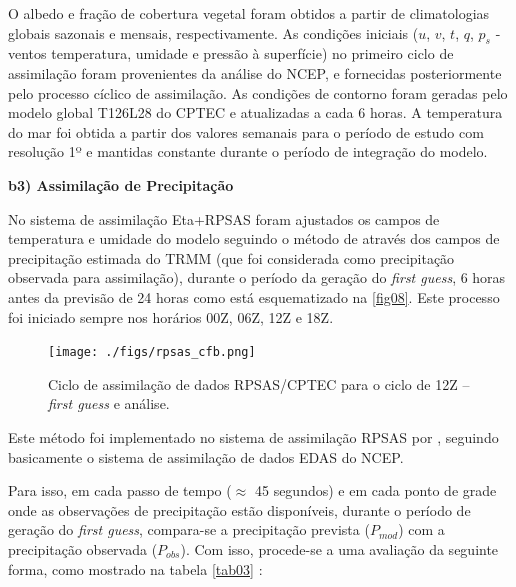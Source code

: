 O albedo e fração de cobertura vegetal foram obtidos a partir de climatologias globais sazonais e mensais, respectivamente. As condições iniciais ($u$, $v$, $t$, $q$, $p_{s}$ - ventos temperatura, umidade e pressão à superfície) no primeiro ciclo de assimilação foram provenientes da análise do NCEP, e fornecidas posteriormente pelo processo cíclico de assimilação.  As condições de contorno foram geradas pelo modelo global T126L28 do CPTEC e atualizadas a cada 6 horas. A temperatura do mar foi obtida a partir dos valores semanais para o período de estudo com resolução 1º e mantidas constante durante o período de integração do modelo.

\textbf{b3) Assimilação de Precipitação}

No sistema de assimilação Eta+RPSAS foram ajustados os campos de temperatura e umidade do modelo seguindo o método de  através dos campos de precipitação estimada do TRMM (que foi considerada como precipitação observada para assimilação), durante o período da geração do \textit{first guess}, 6 horas antes da previsão de 24 horas como está esquematizado na \autoref{fig08}. Este processo foi iniciado sempre nos horários 00Z, 06Z, 12Z e 18Z.

\begin{figure}
\centering
\texttt{[image: ./figs/rpsas\_cfb.png]}
\caption{Ciclo de assimilação de dados RPSAS/CPTEC para o ciclo de 12Z – \textit{first guess} e análise.}
\label{fig08}
\end{figure}

Este método foi implementado no sistema de assimilação RPSAS por , seguindo basicamente o sistema de assimilação de dados EDAS do NCEP.

Para isso, em cada passo de tempo ($\approx$ 45 segundos) e em cada ponto de grade onde as observações de precipitação estão disponíveis, durante o período de geração do \textit{first guess}, compara-se a precipitação prevista ($P_{mod}$) com a precipitação observada ($P_{obs}$). Com isso, procede-se a uma avaliação da seguinte forma, como mostrado na tabela \autoref{tab03} \cite{linetal01}:

